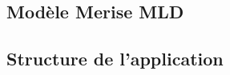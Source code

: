 \documentclass[a4paper]{article}
\begin{document}
\subsection{Modèle Merise MLD}

\subsection{Structure de l'application}
\end{document}
